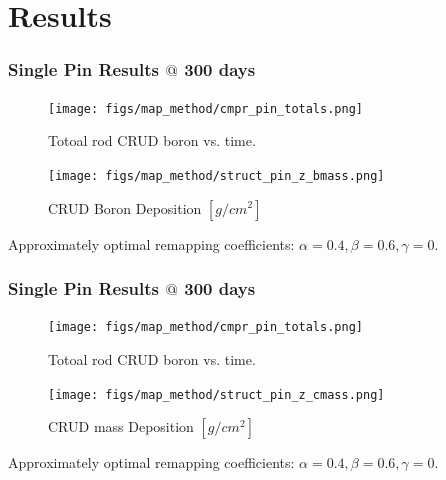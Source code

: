 \documentclass[t, pdftex]{beamer}
\begin{document}
\section{Results}
\begin{frame}
\frametitle{Single Pin Results $@$ 300 days}
    \begin{figure}
        \centering
        \begin{minipage}{.5\textwidth}
            \centering
            \texttt{[image: figs/map\_method/cmpr\_pin\_totals.png]}
            \caption{Totoal rod CRUD boron vs. time.}
        \end{minipage}%
        \begin{minipage}{.5\textwidth}
            \centering
            \texttt{[image: figs/map\_method/struct\_pin\_z\_bmass.png]}
            \caption{ CRUD Boron Deposition $[g/cm^2]$}
        \end{minipage}
    \end{figure}
Approximately optimal remapping coefficients: $\alpha=0.4, \beta=0.6, \gamma=0$.  
\end{frame}


\begin{frame}
\frametitle{Single Pin Results $@$ 300 days}
    \begin{figure}
        \centering
        \begin{minipage}{.5\textwidth}
            \centering
            \texttt{[image: figs/map\_method/cmpr\_pin\_totals.png]}
            \caption{Totoal rod CRUD boron vs. time.}
        \end{minipage}%
        \begin{minipage}{.5\textwidth}
            \centering
            \texttt{[image: figs/map\_method/struct\_pin\_z\_cmass.png]}
            \caption{ CRUD mass Deposition $[g/cm^2]$}
        \end{minipage}
    \end{figure}
Approximately optimal remapping coefficients: $\alpha=0.4, \beta=0.6, \gamma=0$.  
\end{frame}
\end{document}
